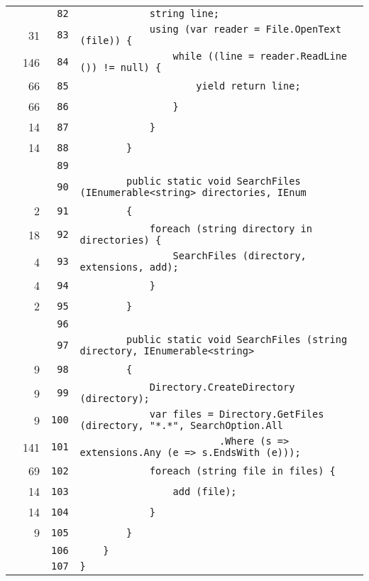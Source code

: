 \documentclass[a4paper,10pt]{article}
\begin{document}
\begin{longtable}[l]{lrrl}
\cellcolor{gray} &  & \verb~82~ & \verb~            string line;~\\
\cellcolor{green} & 31 & \verb~83~ & \verb~            using (var reader = File.OpenText (file)) {~\\
\cellcolor{green} & 146 & \verb~84~ & \verb~                while ((line = reader.ReadLine ()) != null) {~\\
\cellcolor{green} & 66 & \verb~85~ & \verb~                    yield return line;~\\
\cellcolor{green} & 66 & \verb~86~ & \verb~                }~\\
\cellcolor{green} & 14 & \verb~87~ & \verb~            }~\\
\cellcolor{green} & 14 & \verb~88~ & \verb~        }~\\
\cellcolor{gray} &  & \verb~89~ & \verb~~\\
\cellcolor{gray} &  & \verb~90~ & \verb~        public static void SearchFiles (IEnumerable<string> directories, IEnum~\\
\cellcolor{green} & 2 & \verb~91~ & \verb~        {~\\
\cellcolor{green} & 18 & \verb~92~ & \verb~            foreach (string directory in directories) {~\\
\cellcolor{green} & 4 & \verb~93~ & \verb~                SearchFiles (directory, extensions, add);~\\
\cellcolor{green} & 4 & \verb~94~ & \verb~            }~\\
\cellcolor{green} & 2 & \verb~95~ & \verb~        }~\\
\cellcolor{gray} &  & \verb~96~ & \verb~~\\
\cellcolor{gray} &  & \verb~97~ & \verb~        public static void SearchFiles (string directory, IEnumerable<string> ~\\
\cellcolor{green} & 9 & \verb~98~ & \verb~        {~\\
\cellcolor{green} & 9 & \verb~99~ & \verb~            Directory.CreateDirectory (directory);~\\
\cellcolor{green} & 9 & \verb~100~ & \verb~            var files = Directory.GetFiles (directory, "*.*", SearchOption.All~\\
\cellcolor{green} & 141 & \verb~101~ & \verb~                        .Where (s => extensions.Any (e => s.EndsWith (e)));~\\
\cellcolor{green} & 69 & \verb~102~ & \verb~            foreach (string file in files) {~\\
\cellcolor{green} & 14 & \verb~103~ & \verb~                add (file);~\\
\cellcolor{green} & 14 & \verb~104~ & \verb~            }~\\
\cellcolor{green} & 9 & \verb~105~ & \verb~        }~\\
\cellcolor{gray} &  & \verb~106~ & \verb~    }~\\
\cellcolor{gray} &  & \verb~107~ & \verb~}~\\
\end{longtable}
\newpage
\end{document}
